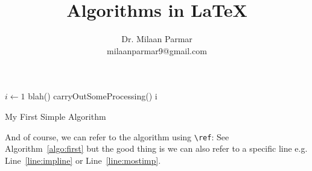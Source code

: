 \documentclass{article}
\begin{document}
\title{Algorithms in \LaTeX}
\author{Dr. Milaan Parmar \\ milaanparmar9@gmail.com}
\maketitle



\begin{algorithm}
\begin{algorithmic}[2]
  \STATE $i\gets1$
\ELSE 
   \label{line:impline}
     \STATE blah()
     \STATE carryOutSomeProcessing() \label{line:mostimp}
   \ENDFOR
  \ENDIF
\ENDIF
\RETURN i
\end{algorithmic}
\caption{My First Simple Algorithm}
\label{algo:first}
\end{algorithm}

And of course, we can refer to the algorithm using \verb|\ref|: See Algorithm~\ref{algo:first} but the good thing is we can also refer to a specific line e.g. Line~\ref{line:impline} or Line~\ref{line:mostimp}.
\end{document}
